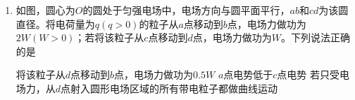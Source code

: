 \documentclass[\gkver]{gaokaozhenti}
\begin{document}
\begin{enumerate}
{	$F_{\text{弹}}=m_{A}a_{A}=m_{B}a_{B}$

	由图可知

	$a_{B}>a_{A}$

	则

	$m_{B}<m_{A}$

	B 正确；

	C．由图可得，$t_{1}$时刻$B$开始运动，此时$A$速度为$v_{0}$，之后$AB$动量守恒，$AB$和弹簧整个系统能量守恒，则

	$m_{A}v_{0}=m_{A}v_{A}+m_{B}v_{B}$

	可得$AB$整体的动能不等于 0，即弹簧的弹性势能会转化为$AB$系统的动能，弹簧的形变量小于$x$，C 错误；

	D．由$a-t$图可知$t_{1}$后$B$脱离墙壁，且弹簧被拉伸，在$t_{1}\sim t_{2}$时间内$AB$组成的系统动量守恒，且在$t_{2}$时刻弹簧的拉伸量达到最大，$A$、$B$共速，由$a-t$图像的面积为$\Delta v$，在$t_{2}$时刻$AB$的速度分别为

	$v_{A}=S_{1}-S_{2}$，$v_{B}=S_{3}$

	$A$、$B$共速，则

	$S_{1}-S_{2}=S_{3}$

	D 正确。

	故选 ABD。
}

\item
如图，圆心为$O$的圆处于匀强电场中，电场方向与圆平面平行，$ab$和$cd$为该圆直径。将电荷量为$q(q>0)$的粒子从$a$点移动到$b$点，电场力做功为$2W(W>0)$；若将该粒子从$c$点移动到$d$点，电场力做功为$W$。下列说法正确的是 


{将该粒子从$d$点移动到$b$点，电场力做功为$0.5W$}
{$a$点电势低于$c$点电势}
{若只受电场力，从$d$点射入圆形电场区域的所有带电粒子都做曲线运动}

\end{enumerate}
\end{document}
